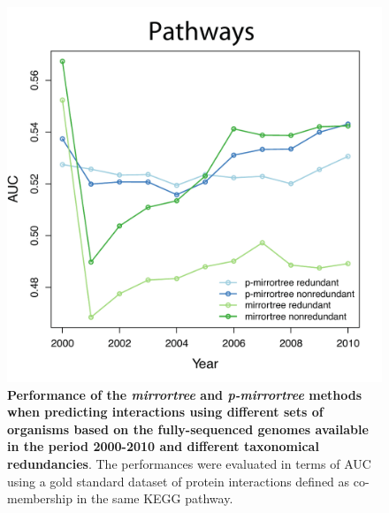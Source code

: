 \begin{figure}[htbp]
\centering
\includegraphics[keepaspectratio,width=\textwidth,height=0.75\textheight]{../figures/mthistoric_pthwys.pdf}
\caption{\textbf{Performance of the \emph{mirrortree} and \emph{p-mirrortree} methods when predicting interactions using different sets of organisms based on the fully-sequenced genomes available in the period 2000-2010 and different taxonomical redundancies}. The performances were evaluated in terms of AUC using a gold standard dataset of protein interactions defined as co-membership in the same KEGG pathway.}
\label{mthistoric_pthwys.pdf}
\end{figure}

